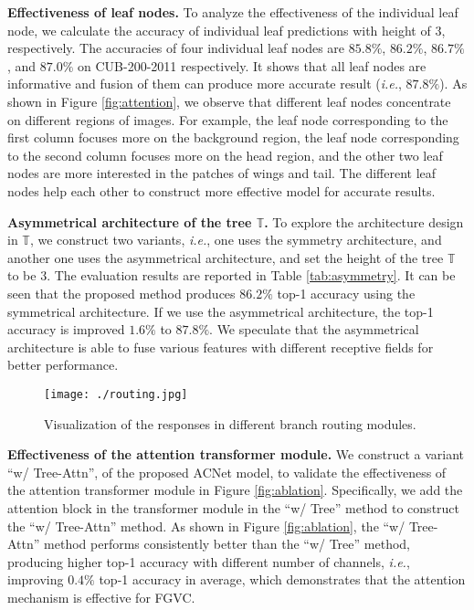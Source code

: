 \documentclass[10pt,twocolumn,letterpaper]{article}
\def\ie{{\em i.e.}}
\begin{document}
{\flushleft \textbf{Effectiveness of leaf nodes.}} To analyze the effectiveness of the individual leaf node, we calculate the accuracy of individual leaf predictions with height of $3$, respectively. The accuracies of four individual leaf nodes are $85.8\%$, $86.2\%$, $86.7\%$, and $87.0\%$ on CUB-200-2011 respectively. It shows that all leaf nodes are informative and fusion of them can produce more accurate result (\ie, $87.8\%$). As shown in Figure \ref{fig:attention}, we observe that different leaf nodes concentrate on different regions of images. For example, the leaf node corresponding to the first column focuses more on the background region, the leaf node corresponding to the second column focuses more on the head region, and the other two leaf nodes are more interested in the patches of wings and tail. The different leaf nodes help each other to construct more effective model for accurate results. 

{\flushleft \textbf{Asymmetrical architecture of the tree $\mathbb{T}$.}}
To explore the architecture design in $\mathbb{T}$, we construct two variants, \ie, one uses the symmetry architecture, and another one uses the asymmetrical architecture, and set the height of the tree $\mathbb{T}$ to be $3$. The evaluation results are reported in Table \ref{tab:asymmetry}. It can be seen that the proposed method produces $86.2\%$ top-1 accuracy using the symmetrical architecture. If we use the asymmetrical architecture, the top-1 accuracy is improved $1.6\%$ to $87.8\%$. We speculate that the asymmetrical architecture is able to fuse various features with different receptive fields for better performance. 

\begin{figure}[t]
\centering
\texttt{[image: ./routing.jpg]}
\caption{Visualization of the responses in different branch routing modules.}
\vspace{-2mm}
\label{fig:routing}
\end{figure}

{\flushleft \textbf{Effectiveness of the attention transformer module.}} We construct a variant ``w/ Tree-Attn'', of the proposed ACNet model, to validate the effectiveness of the attention transformer module in Figure \ref{fig:ablation}. Specifically, we add the attention block in the transformer module in the ``w/ Tree'' method to construct the ``w/ Tree-Attn'' method. As shown in Figure \ref{fig:ablation}, the ``w/ Tree-Attn'' method performs consistently better than the ``w/ Tree'' method, producing higher top-1 accuracy with different number of channels, \ie, improving $0.4\%$ top-1 accuracy in average, which demonstrates that the attention mechanism is effective for FGVC. 
\end{document}
